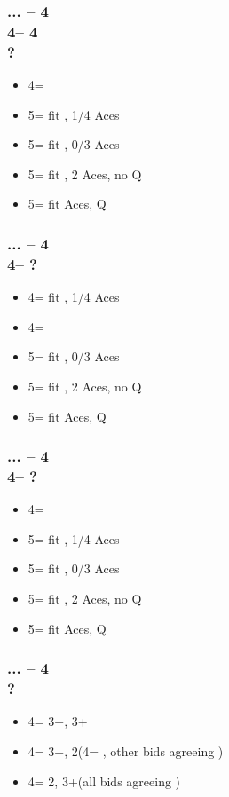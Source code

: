 \documentclass[12pt, a4paper]{article}
\begin{document}
\subsubsection*{... -- 4\clubs\\
                4\diams -- 4\spades\\
                ?}
\begin{itemize}
    \item 4\nt = \soff
    \item 5\clubs = fit \diams, 1/4 Aces
    \item 5\diams = fit \diams, 0/3 Aces
    \item 5\hearts = fit \diams, 2 Aces, no Q\diams
    \item 5\spades = fit  Aces, Q\diams
\end{itemize}

\subsubsection*{... -- 4\clubs\\
                4\hearts -- ?}
\begin{itemize}
    \item 4\spades = fit \clubs, 1/4 Aces
    \item 4\nt = \soff
    \item 5\clubs = fit \clubs, 0/3 Aces
    \item 5\diams = fit \clubs, 2 Aces, no Q\clubs
    \item 5\hearts = fit  Aces, Q\clubs
\end{itemize}

\subsubsection*{... -- 4\clubs\\
                4\spades -- ?}
\begin{itemize}
    \item 4\nt = \soff
    \item 5\clubs = fit \diams, 1/4 Aces
    \item 5\diams = fit \diams, 0/3 Aces
    \item 5\hearts = fit \diams, 2 Aces, no Q\diams
    \item 5\spades = fit  Aces, Q\diams
\end{itemize}

\subsubsection*{... -- 4\diams\\
                ?}
\begin{itemize}
    \item 4\hearts = 3+\clubs, 3+\diams
    \item 4\spades = 3+\clubs, 2\diams (4\nt = \soff, other bids agreeing \clubs)
    \item 4\nt = 2\clubs, 3+\diams (all bids agreeing \diams)
\end{itemize}
\end{document}
